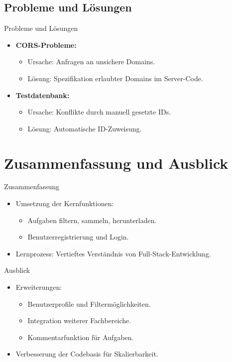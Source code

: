 \documentclass{beamer}
\begin{document}
\subsection{Probleme und Lösungen}
\begin{frame}{Probleme und Lösungen}
    \begin{itemize}
        \item<1-> \textbf{CORS-Probleme:}
        \begin{itemize}
            \item Ursache: Anfragen an unsichere Domains.
            \item Lösung: Spezifikation erlaubter Domains im Server-Code.
        \end{itemize}
        \item<2-> \textbf{Testdatenbank:}
        \begin{itemize}
            \item Ursache: Konflikte durch manuell gesetzte IDs.
            \item Lösung: Automatische ID-Zuweisung.
        \end{itemize}
    \end{itemize}
\end{frame}

\section{Zusammenfassung und Ausblick}
\begin{frame}{Zusammenfassung}
    \begin{itemize}
        \item<1-> Umsetzung der Kernfunktionen:
        \begin{itemize}
            \item Aufgaben filtern, sammeln, herunterladen.
            \item Benutzerregistrierung und Login.
        \end{itemize}
        \item<2-> Lernprozess: Vertieftes Verständnis von Full-Stack-Entwicklung.
    \end{itemize}
\end{frame}

\begin{frame}{Ausblick}
    \begin{itemize}
        \item<1-> Erweiterungen:
        \begin{itemize}
            \item Benutzerprofile und Filtermöglichkeiten.
            \item Integration weiterer Fachbereiche.
            \item Kommentarfunktion für Aufgaben.
        \end{itemize}
        \item<2-> Verbesserung der Codebasis für Skalierbarkeit.
    \end{itemize}
\end{frame}
\end{document}
